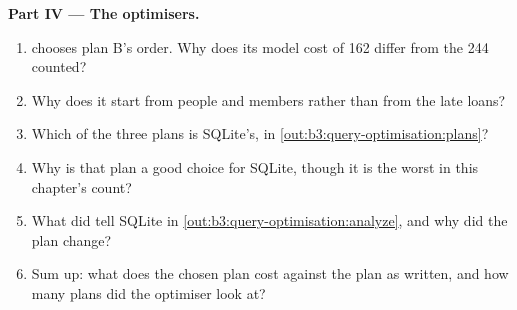 \begin{problem}
\medskip\noindent\textbf{Part IV --- The optimisers.}
\begin{enumerate}[resume]
  \item {} chooses plan B's order. Why does its model cost of 162 differ from the 244 counted?
  \item Why does it start from people and members rather than from the late loans?
  \item Which of the three plans is SQLite's, in \cref{out:b3:query-optimisation:plans}?
  \item Why is that plan a good choice for SQLite, though it is the worst in this chapter's count?
  \item What did  tell SQLite in \cref{out:b3:query-optimisation:analyze}, and why did the plan change?
  \item Sum up: what does the chosen plan cost against the plan as written, and how many plans did the optimiser look at?
\end{enumerate}
\end{problem}
